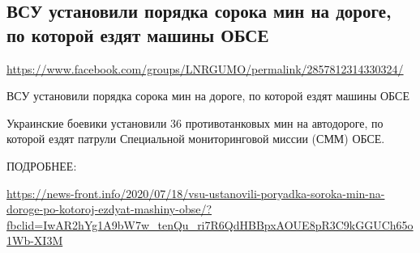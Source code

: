  
 
\subsection{ВСУ установили порядка сорока мин на дороге, по которой ездят машины ОБСЕ}
\label{sec:19_07_2020.fb.lnr.1}
\url{https://www.facebook.com/groups/LNRGUMO/permalink/2857812314330324/}


  
ВСУ установили порядка сорока мин на дороге, по которой ездят машины ОБСЕ

Украинские боевики установили 36 противотанковых мин на автодороге, по которой
ездят патрули Специальной мониторинговой миссии (СММ) ОБСЕ.

ПОДРОБНЕЕ:
  
\url{https://news-front.info/2020/07/18/vsu-ustanovili-poryadka-soroka-min-na-doroge-po-kotoroj-ezdyat-mashiny-obse/?fbclid=IwAR2hYg1A9bW7w_tenQu_ri7R6QdHBBpxAOUE8pR3C9kGGUCh65o1Wb-XI3M}
